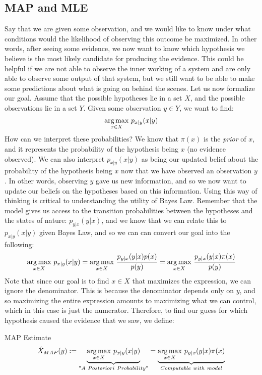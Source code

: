 \subsection{MAP and MLE}
Say that we are given some observation, and we would like to know under what conditions would the likelihood of observing this outcome be maximized. In other words, after seeing some evidence, we now want to know which hypothesis we believe is the most likely candidate for producing the evidence. This could be helpful if we are not able to observe the inner working of a system and are only able to observe some output of that system, but we still want to be able to make some predictions about what is going on behind the scenes. Let us now formalize our goal. Assume that the possible hypotheses lie in a set \(X\), and the possible observations lie in a set \(Y\). Given some observation \(y \in Y\), we want to find:
\begin{equation*}
  \underset{x \in X}{\operatorname*{arg\,max}}\ p_{x|y}(x|y)
\end{equation*}
How can we interpret these probabilities? We know that \(\pi(x)\) is the \textit{prior} of \(x\), and it represents the probability of the hypothesis being \(x\) (no evidence observed). We can also interpret \(p_{x|y}(x|y)\) as being our updated belief about the probability of the hypothesis being \(x\) now that we have observed an observation \(y\). In other words, observing \(y\) gave us new information, and so we now want to update our beliefs on the hypotheses based on this information. Using this way of thinking is critical to understanding the utility of Bayes Law. Remember that the model gives us access to the transition probabilities between the hypotheses and the states of nature: \(p_{y|x}(y|x)\), and we know that we can relate this to \(p_{x|y}(x|y)\) given Bayes Law, and so we can can convert our goal into the following:
\begin{equation*}
  \underset{x\in X}{\operatorname*{arg\,max}}\ p_{x|y}(x|y) = \underset{x \in X}{\operatorname*{arg\,max}}\ \frac{p_{y|x}(y|x)p(x)}{p(y)} = \underset{x\in X}{\operatorname*{arg\,max}}\  \frac{p_{y|x}(y|x)\pi(x)}{p(y)}
\end{equation*}
Note that since our goal is to find \(x\in X\) that maximizes the expression, we can ignore the denominator. This is because the denominator depends only on \(y\), and so maximizing the entire expression amounts to maximizing what we can control, which in this case is just the numerator. Therefore, to find our guess for which hypothesis caused the evidence that we saw, we define:
\begin{defn}{MAP Estimate}{}
\begin{equation*}
  \MAP (y) := \underbrace{\underset{x \in X}{\argmax}\ p_{x|y}(x|y)}_{"A\ Posteriori \ Probability"} = \underbrace{\underset{x\in X}{\argmax}\ p_{y|x}(y|x)\pi(x)}_{Computable \ with \ model}
\end{equation*}
\end{defn}

